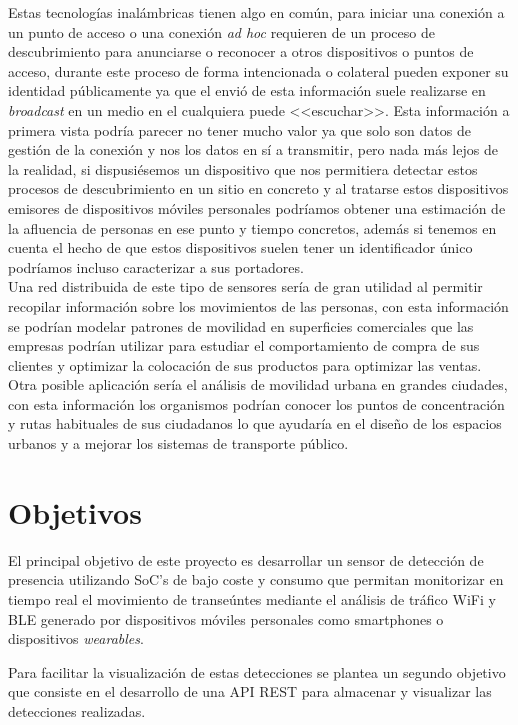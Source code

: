 \documentclass[../proyecto.tex]{subfiles}
\begin{document}
Estas tecnologías inalámbricas tienen algo en común, para iniciar una conexión a un punto de acceso o una conexión \textit{ad hoc} requieren de un proceso de descubrimiento para anunciarse o reconocer a otros dispositivos o puntos de acceso, durante este proceso de forma intencionada o colateral pueden exponer su identidad públicamente ya que el envió de esta información suele realizarse en \textit{broadcast} en un medio en el cualquiera puede <<escuchar>>. Esta información a primera vista podría parecer no tener mucho valor ya que solo son datos de gestión de la conexión y nos los datos en sí a transmitir, pero nada más lejos de la realidad, si dispusiésemos un dispositivo que nos permitiera detectar estos procesos de descubrimiento en un sitio en concreto y al tratarse estos dispositivos emisores de dispositivos móviles personales podríamos obtener una estimación de la afluencia de personas en ese punto y tiempo concretos, además si tenemos en cuenta el hecho de que estos dispositivos suelen tener un identificador único podríamos incluso caracterizar a sus portadores.\\

Una red distribuida de este tipo de sensores sería de gran utilidad al permitir recopilar información sobre los movimientos de las personas, con esta información se podrían modelar patrones de movilidad en superficies comerciales que las empresas podrían utilizar para estudiar el comportamiento de compra de sus clientes y optimizar la colocación de sus productos para optimizar las ventas. Otra posible aplicación sería el análisis de movilidad urbana en grandes ciudades, con esta información los organismos podrían conocer los puntos de concentración y rutas habituales de sus ciudadanos lo que ayudaría en el diseño de los espacios urbanos y a mejorar los sistemas de transporte público.
\\


\section{Objetivos}

El principal objetivo de este proyecto es desarrollar un sensor de detección de presencia utilizando SoC's de bajo coste y consumo que permitan monitorizar en tiempo real el movimiento de transeúntes mediante el análisis de tráfico WiFi y BLE generado por dispositivos móviles personales como smartphones o dispositivos \textit{wearables}.

Para facilitar la visualización de estas detecciones se plantea un segundo objetivo que consiste en el desarrollo de una API REST para almacenar y visualizar las detecciones realizadas.
\\
\end{document}
